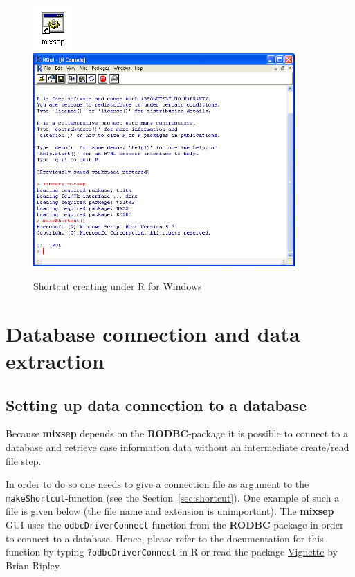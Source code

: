 \documentclass[a4paper,11pt]{article}
\newcommand{\code}[1]{\texttt{#1}}
\newcommand{\pkg}[1]{\textbf{#1}}
\begin{document}
\begin{figure}[!h]
  \centering
  \includegraphics{shortcut_icon}
  \includegraphics[width=10cm]{shortcut_make}
  \caption{\label{fig:shortcut}Shortcut creating under \textsf{R} for
    Windows}
\end{figure}


\section{Database connection and data extraction}
\label{sec:db}

\subsection{Setting up data connection to a database}
\label{sec:setup-db}

Because \pkg{mixsep} depends on the \pkg{RODBC}-package it is
possible to connect to a database and retrieve case information data
without an intermediate create/read file step.

In order to do so one needs to give a connection file as argument to
the \code{makeShortcut}-function (see the
Section~\ref{sec:shortcut}). One example of such a file is given below
(the file name and extension is unimportant). The \pkg{mixsep} GUI
uses the \code{odbcDriverConnect}-function from the
\pkg{RODBC}-package in order to connect to a database. Hence, please
refer to the documentation for this function by typing
\code{?odbcDriverConnect} in \textsf{R} or read the package
\href{http://cran.r-project.org/web/packages/RODBC/vignettes/RODBC.pdf}{Vignette}
by Brian Ripley.
\end{document}
